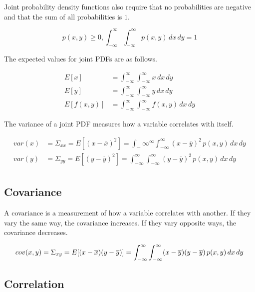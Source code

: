 Joint probability density functions also require that no probabilities are
negative and that the sum of all probabilities is $1$.

\begin{equation*}
  p(x, y) \geq 0, \int_{-\infty}^\infty \int_{-\infty}^{\infty} p(x, y) \,dx
    \,dy = 1
\end{equation*}

The expected values for joint PDFs are as follows.

\begin{align*}
  E[x] &= \int_{-\infty}^\infty \int_{-\infty}^{\infty} x \,dx \,dy \\
  E[y] &= \int_{-\infty}^\infty \int_{-\infty}^{\infty} y \,dx \,dy \\
  E[f(x, y)] &= \int_{-\infty}^\infty \int_{-\infty}^{\infty} f(x, y) \,dx \,dy
\end{align*}

The variance of a joint PDF measures how a variable correlates with itself.

\begin{align*}
  var(x) &= \Sigma_{xx} = E[(x - \overline{x})^2] =
    \int_-\infty^{\infty} \int_{-\infty}^\infty (x - \overline{y})^2 \,p(x, y)
    \,dx \,dy \\
  var(y) &= \Sigma_{yy} = E[(y - \overline{y})^2] =
    \int_{-\infty}^\infty \int_{-\infty}^\infty (y - \overline{y})^2 \,p(x, y)
    \,dx \,dy \\
\end{align*}

\subsection{Covariance}

A covariance is a measurement of how a variable correlates with another. If they
vary the same way, the covariance increases. If they vary opposite ways, the
covariance decreases.

\begin{equation*}
  cov(x, y) = \Sigma_{xy} = E[(x - \overline{x})(y - \overline{y})] =
    \int_{-\infty}^\infty \int_{-\infty}^\infty (x - \overline{y})
    (y - \overline{y}) \,p(x, y) \,dx \,dy \\
\end{equation*}

\subsection{Correlation}

